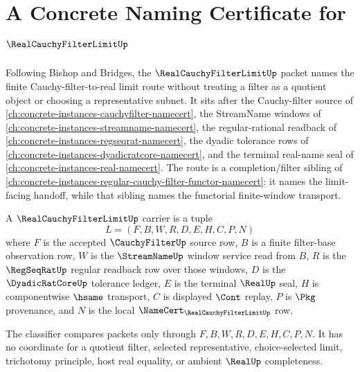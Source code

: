 \chapter{A Concrete Naming Certificate for $\RealCauchyFilterLimitUp$}
\label{ch:concrete-instances-real-cauchy-filter-limit-namecert}

Following Bishop and Bridges, the $\RealCauchyFilterLimitUp$ packet names the finite Cauchy-filter-to-real limit route without treating a filter as a quotient object or choosing a representative subnet. It sits after the Cauchy-filter source of \autoref{ch:concrete-instances-cauchyfilter-namecert}, the StreamName windows of \autoref{ch:concrete-instances-streamname-namecert}, the regular-rational readback of \autoref{ch:concrete-instances-regseqrat-namecert}, the dyadic tolerance rows of \autoref{ch:concrete-instances-dyadicratcore-namecert}, and the terminal real-name seal of \autoref{ch:concrete-instances-real-namecert}. The route is a completion/filter sibling of \autoref{ch:concrete-instances-regular-cauchy-filter-functor-namecert}: it names the limit-facing handoff, while that sibling names the functorial finite-window transport.

\begin{definition}
\label{def:real-cauchy-filter-limit-carrier}
A $\RealCauchyFilterLimitUp$ carrier is a tuple
$$
L=(F,B,W,R,D,E,H,C,P,N)
$$
where $F$ is the accepted $\CauchyFilterUp$ source row, $B$ is a finite filter-base observation row, $W$ is the $\StreamNameUp$ window service read from $B$, $R$ is the $\RegSeqRatUp$ regular readback row over those windows, $D$ is the $\DyadicRatCoreUp$ tolerance ledger, $E$ is the terminal $\RealUp$ seal, $H$ is componentwise $\hsame$ transport, $C$ is displayed $\Cont$ replay, $P$ is $\Pkg$ provenance, and $N$ is the local $\NameCert_{\RealCauchyFilterLimitUp}$ row.

The classifier compares packets only through $F,B,W,R,D,E,H,C,P,N$. It has no coordinate for a quotient filter, selected representative, choice-selected limit, trichotomy principle, host real equality, or ambient $\RealUp$ completeness.
\end{definition}

